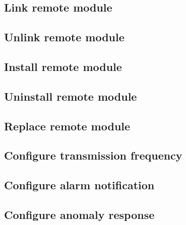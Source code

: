 \newpage
\subsection{Link remote module}
\label{uc:link-remote-module}


\newpage
\subsection{Unlink remote module}
\label{uc:unlink-remote-module}


\newpage
\subsection{Install remote module}
\label{uc:install-remote-module}


\newpage
\subsection{Uninstall remote module}
\label{uc:uninstall-remote-module}


\newpage
\subsection{Replace remote module}
\label{uc:replace-remote-module}


\newpage
\subsection{Configure transmission frequency}
\label{uc:configure-transmission-frequency}


\newpage
\subsection{Configure alarm notification}
\label{uc:configure-alarm-notification}


\newpage
\subsection{Configure anomaly response}
\label{uc:configure-anomaly-response}


